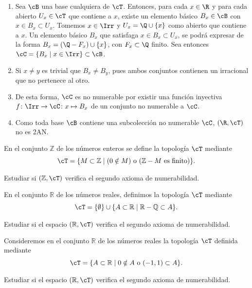 \begin{ex}
    \begin{enumerate}[topsep=5pt, itemsep=0pt]
        \item Sea $\cB$ una base cualquiera de $\cT$. Entonces, para cada $x \in \R$ y para cada abierto $U_x \in \cT$ que contiene a $x$, existe un elemento básico $B_x\in\cB$ con $x\in B_x \subset U_x$. Tomemos $x\in \Irr$ y $U_x = \Q \cup \{x\}$ como abierto que contiene a $x$. Un elemento básico $B_x$ que satisfaga $x\in B_x \subset U_x$, se podrá expresar de la forma $B_x = (\Q - F_x) \cup \{x\}$, con $F_x\subset\Q$ finito. Sea entonces $\cC = \{B_x \mid x\in  \Irr\} \subset \cB$.
        \item Si $x\neq y$ es trivial que $B_x \neq B_y$, pues ambos conjuntos contienen un irracional que no pertenece al otro.
        \item De esta forma, $\cC$ es no numerable por existir una función inyectiva $f\colon \Irr\to\cC \colon x \mapsto B_x$ de un conjunto no numerable a $\cC$.
        \item Como toda base $\cB$ contiene una subcolección no numerable $\cC$, $(\R,\cT)$ no es 2AN.
    \end{enumerate}
\end{ex}

\begin{ex}
    \hypertarget{2025 A 2}{}
    En el conjunto \(\mathbb{Z}\) de los números enteros se define la topología \(\cT\) mediante
    \[
        \cT = \{M \subset \mathbb{Z} \mid (0 \notin M) \text{ o } (\mathbb{Z} - M \text{ es finito})\}.
    \]

    Estudiar si \((\mathbb{Z},\cT)\)  verifica el segundo axioma de numerabilidad.
\end{ex}

\begin{ex}
    \hypertarget{2026 A 3}{}
    En el conjunto \(\mathbb{R}\) de los números reales, definimos la topología \(\cT\) mediante \[\cT = \{\emptyset\} \cup \{A \subset \mathbb{R} \mid \mathbb{R} - \mathbb{Q} \subset A\}.\]

    Estudiar si el espacio \((\mathbb{R}, \cT)\) verifica el segundo axioma de numerabilidad.

\end{ex}

\begin{ex}
    \hypertarget{2026 B 3}{}
    Consideremos en el conjunto \(\mathbb{R}\) de los números reales la topología \(\cT\) definida mediante \[\cT = \{A \subset \mathbb{R} \mid 0 \notin A \text{ o } (-1, 1) \subset A\}.\]

    Estudiar si el espacio \((\mathbb{R}, \cT)\) verifica el segundo axioma de numerabilidad.

\end{ex}

